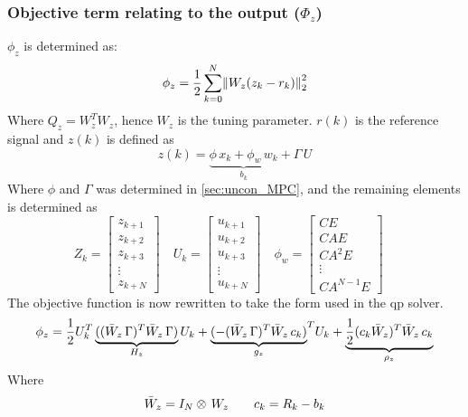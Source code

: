 \subsubsection*{Objective term relating to the output ($\Phi_z$)}
$\phi_z$ is determined as:
\begin{equation}
    \phi_z=\frac{1}{2}\, \overset{N}{\underset{k=0}{\sum}}\norm{W_z(z_k-r_k)}_2^2
\end{equation}
Where $Q_z=W_z^TW_z$, hence $W_z$ is the tuning parameter. $r(k)$ is the reference signal and $z(k)$ is defined as 
\begin{equation}
    z(k)=\underbrace{\phi\,x_k+\phi_w\,w_k}_{b_k}+\Gamma\,U
\end{equation}
Where $\phi$ and $\Gamma$ was determined in \cref{sec:uncon_MPC}, and the remaining elements is determined as
\begin{equation*}
    Z_k=\begin{bmatrix}
        z_{k+1}\\
        z_{k+2}\\
        z_{k+3}\\
        \vdots\\
        z_{k+N}
    \end{bmatrix} \quad
    U_k=\begin{bmatrix}
        u_{k+1}\\
        u_{k+2}\\
        u_{k+3}\\
        \vdots\\
        u_{k+N}
    \end{bmatrix} \quad
    \phi_w=\begin{bmatrix}
        CE\\
        CAE\\
        CA^2E\\
        \vdots\\
        CA^{N-1}E
    \end{bmatrix} \quad
\end{equation*}
The objective function is now rewritten to take the form used in the qp solver.
\begin{equation}
    \phi_z=\frac{1}{2}U_k^T\underbrace{((\Bar{W}_z\,\Gamma)^T\Bar{W}_z\,\Gamma)}_{H_z}U_k+{\underbrace{(-(\Bar{W}_z\,\Gamma)^T\Bar{W}_z\,c_k)}_{g_z}}^TU_k+\underbrace{\frac{1}{2}(c_k\Bar{W}_z)^T\Bar{W}_z\,c_k}_{\rho_z}
\end{equation}
Where
\begin{equation}
    \Bar{W}_z=I_N\otimes\,W_z \qquad c_k=R_k-b_k
\end{equation}
